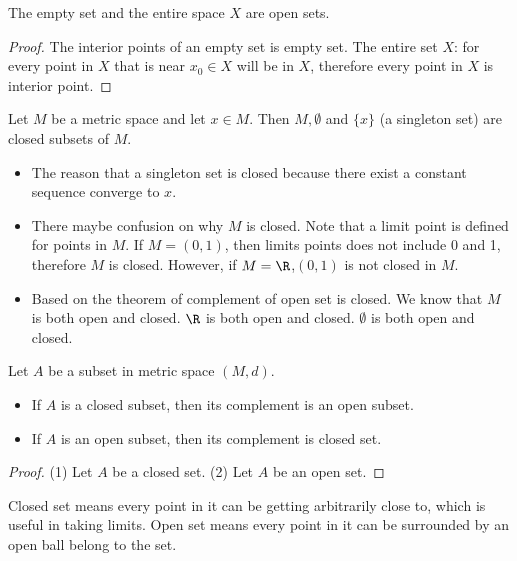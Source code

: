 \begin{refsection}
\begin{theorem}The empty set and the entire space $X$ are open sets.
\end{theorem}
\begin{proof}
	The interior points of an empty set is empty set. The entire set $X$: for every point in $X$ that is near $x_0 \in X$ will be in $X$, therefore every point in $X$ is interior point.	
\end{proof}

\begin{theorem}
	Let $M$ be a metric space and let $x\in M$. Then $M,\emptyset$ and $\{x\}$ (a singleton set) are closed subsets of $M$.
\end{theorem}
\begin{remark}\hfill
	\begin{itemize}
		\item The reason that a singleton set is closed because there exist a constant sequence converge to $x$.
		\item There maybe confusion on why $M$ is closed. Note that a limit point is defined for points in $M$. If $M=(0,1)$, then limits points does not include 0 and 1, therefore $M$ is closed. However, if $M=\R$,$(0,1)$ is not closed in $M$.
		\item Based on the theorem of complement of open set is closed. We know that $M$ is both open and closed. $\R$ is both open and closed. $\emptyset$ is both open and closed. 
	\end{itemize}
\end{remark}

\begin{theorem}\cite[285]{fitzpatrick2006advanced}\label{ch:metric-space:th:complementary characterizationOpenClosedSetsInMetricSpace}
	Let $A$ be a subset in metric space $(M,d)$. 
	\begin{itemize}
		\item If $A$ is a closed subset, then its complement is an open subset.
		\item If $A$ is an open subset, then its complement is closed set.
	\end{itemize}	 
\end{theorem}
\begin{proof}
	(1)	
	Let $A$ be a closed set.
	(2)
	Let $A$ be an open set. 	
\end{proof}


\begin{remark}
	Closed set means every point in it can be getting arbitrarily close to, which is useful in taking limits. Open set means every point in it can be surrounded by an open ball belong to the set.
\end{remark}



\end{refsection}
